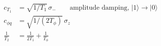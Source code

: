 \documentclass[12pt]{article}
\begin{document}
\fontsize{22}{28}\selectfont
\begin{align*}
c_{T_1} &= \sqrt{1/T_1}\,\sigma_-
      \qquad\text{amplitude damping, }|1\rangle\to|0\rangle \\[0.45em]
c_{\phi q} &= \sqrt{1/(2T_\phi)}\,\sigma_z \\[0.45em]
\frac{1}{T_2} &= \frac{1}{2T_1}+\frac{1}{T_\phi}
\end{align*}
\end{document}
